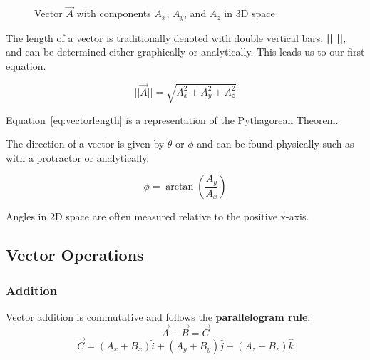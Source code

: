 \documentclass[a4paper, 11pt]{book}
\begin{document}
\begin{figure}[h]
\centering


\caption{Vector $\vec{A}$ with components $A_x$, $A_y$, and $A_z$ in 3D space}

\end{figure}


\noindent The length of a vector is traditionally denoted with double vertical bars, \textbf{|| ||}, and can be determined either
graphically or analytically. This leads us to our first equation.

\begin{equation}
\label{eq:vectorlength}
||\vec{A}|| = \sqrt{A_x^2 + A_y^2 + A_z^2}
\end{equation}

Equation~\ref{eq:vectorlength} is a representation of the Pythagorean Theorem.

\vspace{.4cm}
\noindent The direction of a vector is given by $\theta$ or $\phi$ and can be found physically such as with a protractor or analytically.

\begin{equation}
\label{eq:vectorangle}
\phi = \arctan\left(\frac{A_y}{A_x}\right)
\end{equation}

Angles in 2D space are often measured relative to the positive x-axis.

\subsection{Vector Operations}

\subsubsection{Addition}
Vector addition is commutative and follows the \textbf{parallelogram rule}:
\[
\vec{A} + \vec{B} = \vec{C}
\]
\[
\vec{C} = (A_x + B_x)\hat{i} + (A_y + B_y)\hat{j} + (A_z + B_z)\hat{k}
\]
\end{document}
